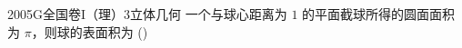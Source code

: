 
\begin{problem}{2005}{G}{全国卷I（理）}{3}{立体几何}
一个与球心距离为 $ 1 $ 的平面截球所得的圆面面积为 $ \pi $，则球的表面积为 (\hspace{1cm})
\begin{choices}
\choice{{$8\pi$}}
\choice{{$4\pi$}}
\end{choices}
\end{problem}

\begin{answer}

\end{answer}

\begin{solutions}

\end{solutions}